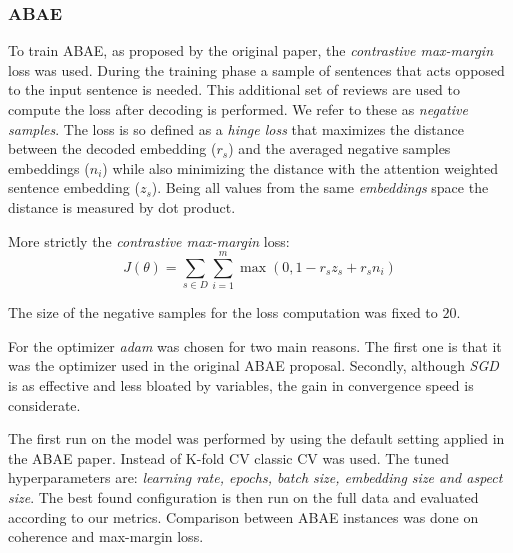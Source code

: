 \subsubsection{ABAE}
To train ABAE, as proposed by the original paper, the \textit{contrastive max-margin} loss was used.
During the training phase a sample of sentences that acts opposed to the input sentence is needed.
This additional set of reviews are used to compute the loss after decoding is performed.
We refer to these as \textit{negative samples}.
The loss is so defined as a \textit{hinge loss} that maximizes the distance between the decoded embedding ($r_s$)
and the averaged negative samples embeddings ($n_i$) while also minimizing the distance with the attention weighted sentence embedding ($z_s$).
Being all values from the same \textit{embeddings} space the distance is measured by dot product.

More strictly the \textit{contrastive max-margin} loss:
$$J(\theta) = \sum_{s\in D}\sum_{i=1}^m \max(0, 1 - r_sz_s + r_sn_i)$$

The size of the negative samples for the loss computation was fixed to $20$.

For the optimizer \textit{adam} was chosen for two main reasons.
The first one is that it was the optimizer used in the original ABAE proposal.
Secondly, although \textit{SGD} is as effective\cite{wilson2018marginal} and less bloated
by variables, the gain in convergence speed is considerate.

The first run on the model was performed by using the default setting applied in the ABAE paper.
Instead of K-fold CV classic CV was used.
The tuned hyperparameters are: \textit{learning rate, epochs, batch size, embedding size and aspect size}.
The best found configuration is then run on the full data and evaluated according to our metrics.
Comparison between ABAE instances was done on coherence and max-margin loss.
